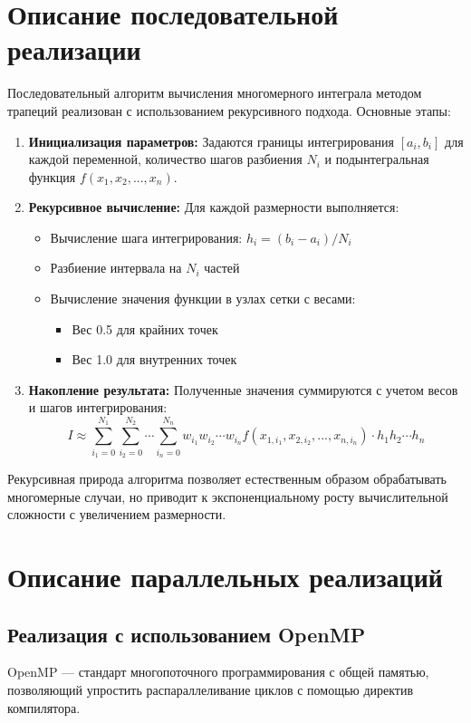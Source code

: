 \documentclass[14pt,a4paper]{extarticle}
\begin{document}
\section{Описание последовательной реализации}
Последовательный алгоритм вычисления многомерного интеграла методом трапеций реализован с использованием рекурсивного подхода. Основные этапы:

\begin{enumerate}
    \item \textbf{Инициализация параметров:} Задаются границы интегрирования $[a_i, b_i]$ для каждой переменной, количество шагов разбиения $N_i$ и подынтегральная функция $f(x_1, x_2, ..., x_n)$.
    
    \item \textbf{Рекурсивное вычисление:} Для каждой размерности выполняется:
    \begin{itemize}
        \item Вычисление шага интегрирования: $h_i = (b_i - a_i)/N_i$
        \item Разбиение интервала на $N_i$ частей
        \item Вычисление значения функции в узлах сетки с весами:
        \begin{itemize}
            \item Вес 0.5 для крайних точек
            \item Вес 1.0 для внутренних точек
        \end{itemize}
    \end{itemize}
    
    \item \textbf{Накопление результата:} Полученные значения суммируются с учетом весов и шагов интегрирования:
    $$I \approx \sum_{i_1=0}^{N_1} \sum_{i_2=0}^{N_2} \cdots \sum_{i_n=0}^{N_n} w_{i_1}w_{i_2}\cdots w_{i_n} f(x_{1,i_1}, x_{2,i_2}, ..., x_{n,i_n}) \cdot h_1h_2\cdots h_n$$
\end{enumerate}

Рекурсивная природа алгоритма позволяет естественным образом обрабатывать многомерные случаи, но приводит к экспоненциальному росту вычислительной сложности с увеличением размерности.
\newpage

\section{Описание параллельных реализаций}

\subsection{Реализация с использованием OpenMP}
OpenMP — стандарт многопоточного программирования с общей памятью, позволяющий упростить распараллеливание циклов с помощью директив компилятора.
\end{document}
